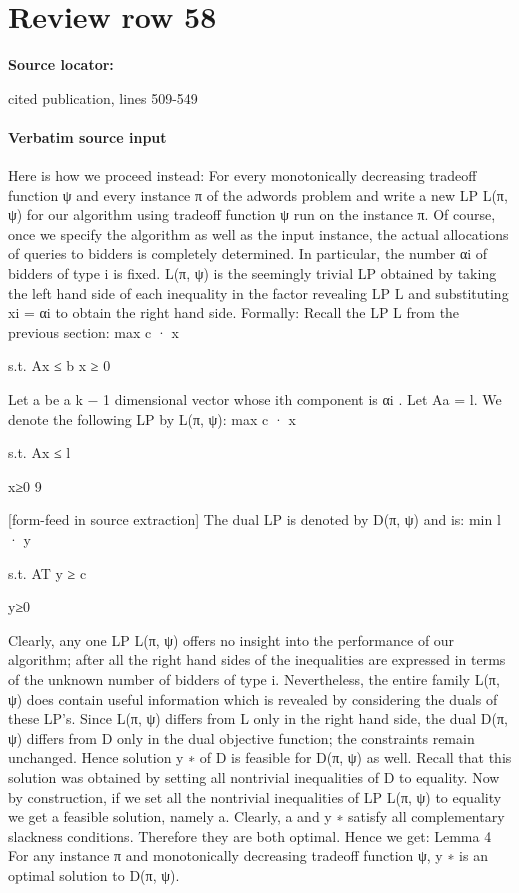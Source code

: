 \documentclass[10pt]{article}
\begin{document}
\section*{Review row 58}
\textbf{Source locator:} {\footnotesize\raggedright cited publication, lines 509-\allowbreak{}549\par}
\paragraph{Verbatim source input}
\begin{ReviewVerbatim}
Here is how we proceed instead: For every monotonically decreasing tradeoff function ψ and
every instance π of the adwords problem and write a new LP L(π, ψ) for our algorithm using
tradeoff function ψ run on the instance π. Of course, once we specify the algorithm as well
as the input instance, the actual allocations of queries to bidders is completely determined.
In particular, the number αi of bidders of type i is fixed. L(π, ψ) is the seemingly trivial
LP obtained by taking the left hand side of each inequality in the factor revealing LP L and
substituting xi = αi to obtain the right hand side. Formally:
Recall the LP L from the previous section:
max c · x

s.t. Ax ≤ b x ≥ 0

Let a be a k − 1 dimensional vector whose ith component is αi . Let Aa = l. We denote the
following LP by L(π, ψ):
max c · x

s.t. Ax ≤ l

x≥0
9


[form-feed in source extraction]
The dual LP is denoted by D(π, ψ) and is:
min l · y

s.t. AT y ≥ c

y≥0

Clearly, any one LP L(π, ψ) offers no insight into the performance of our algorithm; after
all the right hand sides of the inequalities are expressed in terms of the unknown number of
bidders of type i. Nevertheless, the entire family L(π, ψ) does contain useful information which
is revealed by considering the duals of these LP’s.
Since L(π, ψ) differs from L only in the right hand side, the dual D(π, ψ) differs from D only
in the dual objective function; the constraints remain unchanged. Hence solution y ∗ of D is
feasible for D(π, ψ) as well. Recall that this solution was obtained by setting all nontrivial
inequalities of D to equality.
Now by construction, if we set all the nontrivial inequalities of LP L(π, ψ) to equality we get a
feasible solution, namely a. Clearly, a and y ∗ satisfy all complementary slackness conditions.
Therefore they are both optimal. Hence we get:
Lemma 4 For any instance π and monotonically decreasing tradeoff function ψ, y ∗ is an
optimal solution to D(π, ψ).
\end{ReviewVerbatim}
\end{document}

